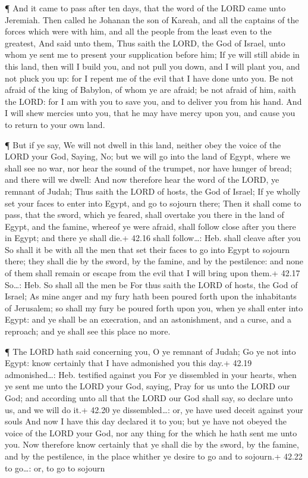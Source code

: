  ¶ And it came to pass after ten days, that the word of the
LORD came unto Jeremiah.  Then called he Johanan the son of
Kareah, and all the captains of the forces which were with him, and all
the people from the least even to the greatest,  And said
unto them, Thus saith the LORD, the God of Israel, unto whom ye sent me
to present your supplication before him;  If ye will still
abide in this land, then will I build you, and not pull you down, and I
will plant you, and not pluck you up: for I repent me of the evil that I
have done unto you.  Be not afraid of the king of Babylon,
of whom ye are afraid; be not afraid of him, saith the LORD: for I am
with you to save you, and to deliver you from his hand. 
And I will shew mercies unto you, that he may have mercy upon you, and
cause you to return to your own land.

 ¶ But if ye say, We will not dwell in this land, neither
obey the voice of the LORD your God,  Saying, No; but we
will go into the land of Egypt, where we shall see no war, nor hear the
sound of the trumpet, nor have hunger of bread; and there will we dwell:
 And now therefore hear the word of the LORD, ye remnant of
Judah; Thus saith the LORD of hosts, the God of Israel; If ye wholly set
your faces to enter into Egypt, and go to sojourn there; 
Then it shall come to pass, that the sword, which ye feared, shall
overtake you there in the land of Egypt, and the famine, whereof ye were
afraid, shall follow close after you there in Egypt; and there ye shall
die.+ 42.16 shall follow\ldots: Heb. shall cleave after you
 So shall it be with all the men that set their faces to go
into Egypt to sojourn there; they shall die by the sword, by the famine,
and by the pestilence: and none of them shall remain or escape from the
evil that I will bring upon them.+ 42.17 So\ldots: Heb. So shall all the
men be  For thus saith the LORD of hosts, the God of
Israel; As mine anger and my fury hath been poured forth upon the
inhabitants of Jerusalem; so shall my fury be poured forth upon you,
when ye shall enter into Egypt: and ye shall be an execration, and an
astonishment, and a curse, and a reproach; and ye shall see this place
no more.

 ¶ The LORD hath said concerning you, O ye remnant of
Judah; Go ye not into Egypt: know certainly that I have admonished you
this day.+ 42.19 admonished\ldots: Heb. testified against you
 For ye dissembled in your hearts, when ye sent me unto the
LORD your God, saying, Pray for us unto the LORD our God; and according
unto all that the LORD our God shall say, so declare unto us, and we
will do it.+ 42.20 ye dissembled\ldots: or, ye have used deceit against
your souls  And now I have this day declared it to you; but
ye have not obeyed the voice of the LORD your God, nor any thing for the
which he hath sent me unto you.  Now therefore know
certainly that ye shall die by the sword, by the famine, and by the
pestilence, in the place whither ye desire to go and to sojourn.+ 42.22
to go\ldots: or, to go to sojourn

